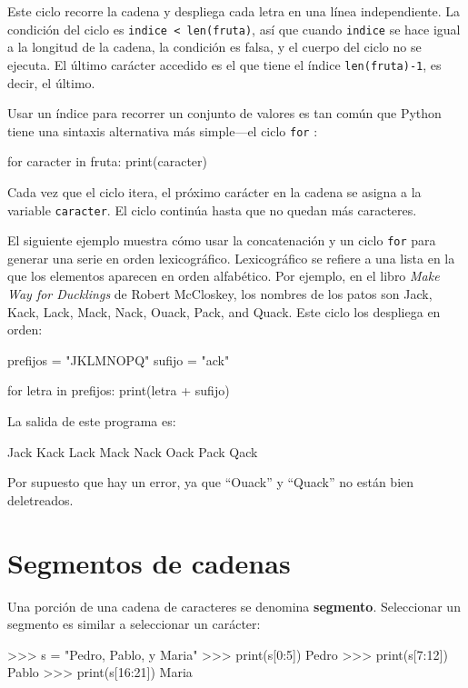 Este ciclo recorre la cadena y despliega cada letra en una línea independiente.
La condición del ciclo es \texttt{indice < len(fruta)}, así que cuando
\texttt{indice} se hace igual a la longitud de la cadena, la condición
es falsa, y el cuerpo del ciclo no se ejecuta. El último carácter
accedido es el que tiene el índice \texttt{len(fruta)-1}, es decir,
el último.

Usar un índice para recorrer un conjunto de valores es tan común que
Python tiene una sintaxis alternativa más simple—el ciclo \texttt{for}
:

\begin{pythoncode}
for caracter in fruta:
   print(caracter)
\end{pythoncode}

Cada vez que el ciclo itera, el próximo carácter en la cadena se asigna
a la variable \texttt{caracter}. El ciclo continúa hasta que no quedan
más caracteres.

  

El siguiente ejemplo muestra cómo usar la concatenación y un ciclo
\texttt{for} para generar una serie en orden lexicográfico. Lexicográfico
se refiere a una lista en la que los elementos aparecen en orden alfabético.
Por ejemplo, en el libro {\em Make Way for Ducklings} de Robert
McCloskey, los nombres de los patos son Jack, Kack, Lack, Mack, Nack,
Ouack, Pack, and Quack. Este ciclo los despliega en orden:
\begin{pythoncode}
prefijos = "JKLMNOPQ"
sufijo = "ack"

for letra in prefijos:
  print(letra + sufijo)
\end{pythoncode}

La salida de este programa es:
\begin{pythoncode}
Jack
Kack
Lack
Mack
Nack
Oack
Pack
Qack
\end{pythoncode}

Por supuesto que hay un error, ya que ``Ouack'' y ``Quack'' no
están bien deletreados.

\section{Segmentos de cadenas }

\label{slice}  

Una porción de una cadena de caracteres se denomina \textbf{segmento}.
Seleccionar un segmento es similar a seleccionar un carácter:
\begin{pyconcode}
>>> s = "Pedro, Pablo, y Maria"
>>> print(s[0:5])
Pedro
>>> print(s[7:12])
Pablo
>>> print(s[16:21])
Maria
\end{pyconcode}

